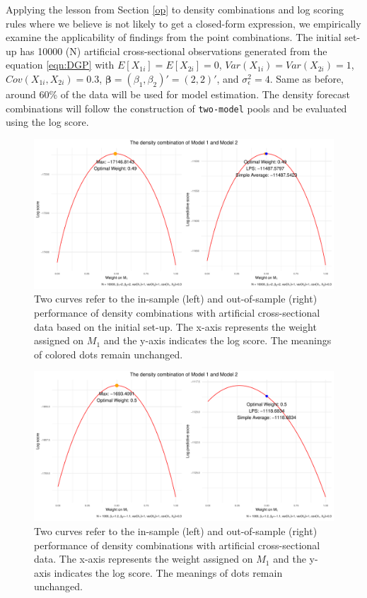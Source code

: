 \documentclass{monashthesis}
\begin{document}
Applying the lesson from Section \ref{op} to density combinations and log scoring rules where we believe is not likely to get a closed-form expression, we empirically examine the applicability of findings from the point combinations. The initial set-up has 10000 (N) artificial cross-sectional observations generated from the equation \ref{eqn:DGP} with \(E[X_{1i}] = E[X_{2i}] = 0\), \(Var(X_{1i}) = Var(X_{2i}) = 1\), \(Cov(X_{1i}, X_{2i}) = 0.3\), \(\pmb{\beta} = (\beta_1, \beta_2)' = (2,2)'\), and \(\sigma^2_{\epsilon}=4\). Same as before, around 60\% of the data will be used for model estimation. The density forecast combinations will follow the construction of \texttt{two-model} pools and be evaluated using the log score.

\begin{figure}[ht]
\centering
\includegraphics[scale=0.6]{figures/LPS_10000.pdf}
\caption{Two curves refer to the in-sample (left) and out-of-sample (right) performance of density combinations with artificial cross-sectional data based on the initial set-up. The x-axis represents the weight assigned on $M_1$ and the y-axis indicates the log score. The meanings of colored dots remain unchanged.}
\label{fig:ss10000}
\end{figure}

\begin{figure}[ht]
\centering
\includegraphics[scale=0.6]{figures/LPS_1000.pdf}
\caption{Two curves refer to the in-sample (left) and out-of-sample (right) performance of density combinations with artificial cross-sectional data. The x-axis represents the weight assigned on $M_1$ and the y-axis indicates the log score. The meanings of dots remain unchanged.}
\label{fig:ss1000}
\end{figure}
\end{document}
